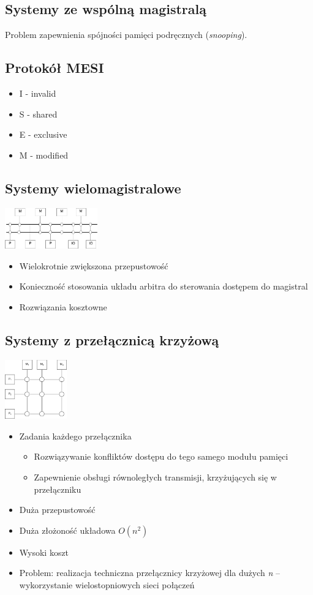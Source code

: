 	\subsection{Systemy ze wspólną magistralą}
		Problem zapewnienia spójności pamięci podręcznych (\emph{snooping}).
		
	\subsection{Protokół MESI}
		\begin{itemize}
			\item I - invalid
			\item S - shared
			\item E - exclusive
			\item M - modified
		\end{itemize}
	\subsection{Systemy wielomagistralowe}
		\includegraphics[width=0.3\textwidth]{./images/wieloproc01}
		\begin{itemize}
			\item Wielokrotnie zwiększona przepustowość
			\item Konieczność stosowania układu arbitra do sterowania dostępem do magistral
			\item Rozwiązania kosztowne
		\end{itemize}
	\subsection{Systemy z przełącznicą krzyżową}
		\includegraphics[width=0.2\textwidth]{./images/wieloproc02}
		\begin{itemize}
			\item Zadania każdego przełącznika
			\begin{itemize}
				\item Rozwiązywanie konfliktów dostępu do tego samego modułu pamięci
				\item Zapewnienie obsługi równoległych transmisji, krzyżujących się w przełączniku
			\end{itemize}
			\item Duża przepustowość
			\item Duża złożoność układowa $ O(n^2) $
			\item Wysoki koszt
			\item Problem: realizacja techniczna przełącznicy krzyżowej dla dużych \emph{n} – wykorzystanie wielostopniowych sieci połączeń
		\end{itemize}
